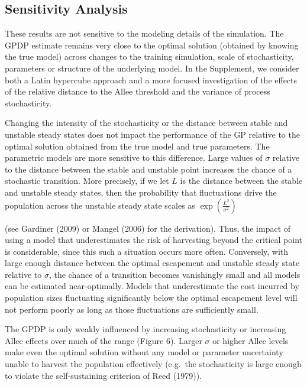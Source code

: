 \documentclass[author-year, 12pt,review]{components/elsarticle} %
\begin{document}
\subsection{Sensitivity Analysis}\label{sensitivity-analysis}

These results are not sensitive to the modeling details of the
simulation. The GPDP estimate remains very close to the optimal solution
(obtained by knowing the true model) across changes to the training
simulation, scale of stochasticity, parameters or structure of the
underlying model. In the Supplement, we consider both a Latin hypercube
approach and a more focused investigation of the effects of the relative
distance to the Allee threshold and the variance of process
stochasticity.

Changing the intensity of the stochasticity or the distance between
stable and unstable steady states does not impact the performance of the
GP relative to the optimal solution obtained from the true model and
true parameters. The parametric models are more sensitive to this
difference. Large values of $\sigma$ relative to the distance between
the stable and unstable point increases the chance of a stochastic
transition. More precisely, if we let $L$ is the distance between the
stable and unstable steady states, then the probability that
fluctuations drive the population across the unstable steady state
scales as $\exp\left(\frac{L^2}{\sigma^2}\right)$

(see Gardiner (2009) or Mangel (2006) for the derivation). Thus, the
impact of using a model that underestimates the risk of harvesting
beyond the critical point is considerable, since this such a situation
occurs more often. Conversely, with large enough distance between the
optimal escapement and unstable steady state relative to $\sigma$, the
chance of a transition becomes vanishingly small and all models can be
estimated near-optimally. Models that underestimate the cost incurred by
population sizes fluctuating significantly below the optimal escapement
level will not perform poorly as long as those fluctuations are
sufficiently small.

The GPDP is only weakly influenced by increasing stochasticity or
increasing Allee effects over much of the range (Figure 6). Larger
$\sigma$ or higher Allee levels make even the optimal solution without
any model or parameter uncertainty unable to harvest the population
effectively (e.g.~the stochasticity is large enough to violate the
self-sustaining criterion of Reed (1979)).
\end{document}
